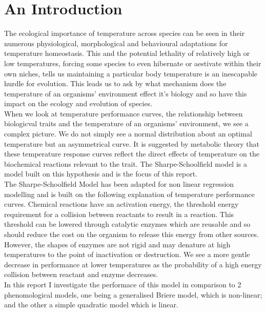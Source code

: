 \documentclass[12pt]{article}
\begin{document}
  \section{An Introduction} 
  The ecological importance of temperature across species can be seen in their numerous physiological, morphological and 
  behavioural adaptations for temperature homeostasis. This and the potential lethality of relatively 
  high or low temperatures, forcing some species to even hibernate or aestivate within their 
  own niches, tells us maintaining a particular body temperature is 
  an inescapable hurdle for evolution. This leads us to ask by what mechanism does the 
  temperature of an organisms' environment effect it's biology and so have this impact on the 
  ecology and evolution of species. \\
  When we look at temperature performance curves, the relationship between biologicval traits and the temperature of an organisms' environment, we 
  see a complex picture. We do not simply see a normal distribution about an optimal temperature but an asymmetrical curve. It is suggested by metabolic theory 
  that these temperature response curves reflect the direct effects of temperature on the biochemical reactions relevant to the trait. The Sharpe-Schoolfield 
  model is a model built on this hypothesis and is the focus of this report. \\
  The Sharpe-Schoolfield Model has been adapted for non linear regression modelling and is built on the following explanation of temperature performance curves. 
  Chemical reactions have an activation energy, the threshold energy requirement for a collision between reactants to result in a reaction. This threshold can 
  be lowered through catalytic enzymes which are reusable and so should reduce the cost on the organism to release this energy from other 
  sources. However, the shapes of enzymes are not rigid and may denature at high temperatures to the point of inactivation or destruction. We see 
  a more gentle decrease in performance at lower temperatures as the probability of a high energy collision between reactant and enzyme decreases.\\
  In this report I investigate the performace of this model in comparison to 2 phenomological models, one being a generalised Briere model, which is non-linear; 
  and the other a simple quadratic model which is linear. \\
\end{document}
